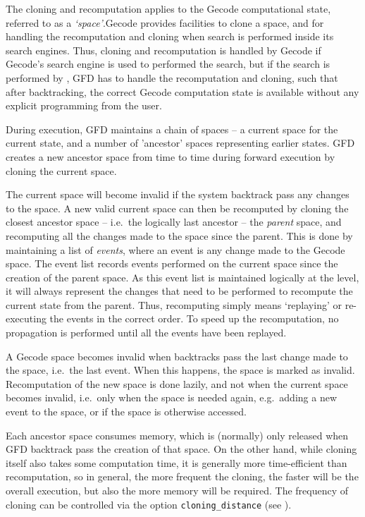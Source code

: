 The cloning and recomputation applies to the Gecode computational state, 
referred to as a {\it `space'}.Gecode provides facilities to clone a space,
and for handling the recomputation and cloning when search is
 performed inside its search engines. Thus, cloning and recomputation is
handled by Gecode if
 Gecode's search engine is used to performed the search, but if the search
is performed by \eclipse, GFD has to handle the recomputation and
 cloning, such that after backtracking, the correct Gecode computation state is available
 without any explicit programming from the user.

During execution, GFD maintains
a chain of spaces -- a current space for the current state, and a
number of 'ancestor' spaces representing earlier states. GFD creates
a new ancestor space from time to time during forward execution 
by cloning the current space.

The current space will become invalid if the system backtrack pass 
any changes to the space. A new valid current space can then be recomputed
by cloning the closest ancestor space -- i.e.\ the logically last ancestor
 -- the {\it parent\/} space, and recomputing all the changes
 made to the space since the parent. This is done by
maintaining a list of {\it events}, where
an event is any change made to the Gecode space. The event list
 records events performed on the current space since the creation of the
parent space. As this event list is 
maintained logically at the \eclipse level, it will always represent the 
changes that need to be performed to recompute the current state from
 the parent. Thus,
recomputing simply means `replaying' or re-executing the events in the 
correct order. To speed up the recomputation, no propagation is
 performed until all the events have been replayed.

A Gecode space becomes invalid when \eclipse backtracks pass the last change
made to the space, i.e.\ the last event. When this happens, the space is marked
as invalid. Recomputation of the new space is done lazily, and not when
the current space becomes invalid, i.e.\ only when the space is needed again,
e.g.\ adding a new event to the space, or if the space is otherwise
accessed.

Each ancestor space consumes memory, which
is (normally) only released when GFD backtrack pass the creation of
 that space. On the 
other hand, while cloning itself also takes some computation time, it is
generally more time-efficient than recomputation, so in general,
the more frequent the cloning, the faster will be the overall execution,
but also the more memory will be required. The frequency of cloning
can be controlled via the option {\tt cloning_distance} (see ).

